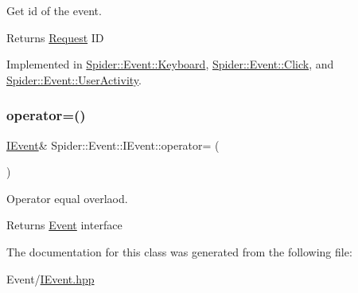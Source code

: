 Get id of the event. 

\begin{DoxyReturn}{Returns}
\hyperlink{class_spider_1_1_event_1_1_request}{Request} ID 
\end{DoxyReturn}


Implemented in \hyperlink{class_spider_1_1_event_1_1_keyboard_aea1252251ac9ee1c7b71d0b0fcc7cc0a}{Spider\+::\+Event\+::\+Keyboard}, \hyperlink{class_spider_1_1_event_1_1_click_a32b810199a69b799589b680bfb9c287d}{Spider\+::\+Event\+::\+Click}, and \hyperlink{class_spider_1_1_event_1_1_user_activity_aabcbc7060a3f015b71f0b26b475ccf75}{Spider\+::\+Event\+::\+User\+Activity}.

\mbox{\label{class_spider_1_1_event_1_1_i_event_a644158f21b7bf172d099819e23d1033e}} 
\subsubsection{\texorpdfstring{operator=()}{operator=()}}
{\footnotesize\ttfamily \hyperlink{class_spider_1_1_event_1_1_i_event}{I\+Event}\& Spider\+::\+Event\+::\+I\+Event\+::operator= (\begin{DoxyParamCaption}\item[{const \hyperlink{class_spider_1_1_event_1_1_i_event}{I\+Event} \&}]{ }\end{DoxyParamCaption})\hspace{0.3cm}{\ttfamily [delete]}}



Operator equal overlaod. 

\begin{DoxyReturn}{Returns}
\hyperlink{namespace_spider_1_1_event}{Event} interface 
\end{DoxyReturn}


The documentation for this class was generated from the following file\+:\begin{DoxyCompactItemize}
\item 
Event/\hyperlink{_i_event_8hpp}{I\+Event.\+hpp}\end{DoxyCompactItemize}
